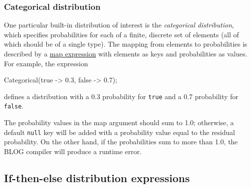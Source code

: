 \documentclass[12pt]{article}
\begin{document}
\subsubsection{Categorical distribution}\label{categorical-section}

One particular built-in distribution of interest is the
{\em categorical distribution}, which specifies probabilities for each
of a finite, discrete set of elements (all of which should be of a
single type). The mapping from elements to probabilities is described
by a \hyperref[map-section]{map expression} with elements as keys and
probabilities as values. For example, the expression
\begin{blogcode}
Categorical({true -> 0.3, false -> 0.7});
\end{blogcode}
defines a distribution with a 0.3 probability for {\tt true} and a 0.7
probability for {\tt false}.

The probability values in the map argument should sum to 1.0;
otherwise, a default \texttt{null} key will be added with a
probability value equal to the residual probability.  On the other hand, if the probabilities sum to more than 1.0, the BLOG
compiler will produce a runtime error.



\subsection{If-then-else distribution expressions}\label{if-then-else-distribution-section}
\end{document}
